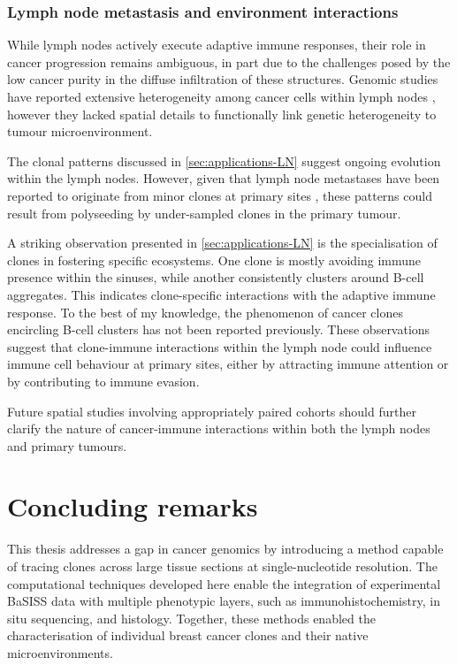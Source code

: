 \subsubsection*{Lymph node metastasis and environment interactions}

While lymph nodes actively execute adaptive immune responses, their role in cancer progression remains ambiguous, in part due to the challenges posed by the low cancer purity in the diffuse infiltration of these structures. Genomic studies have reported extensive heterogeneity among cancer cells within lymph nodes \parencite{Pal2021-rf,Barry2018-el,Bao2018-kj}, however they lacked spatial details to functionally link genetic heterogeneity to tumour microenvironment.

The clonal patterns discussed in \cref{sec:applications-LN} suggest ongoing evolution within the lymph nodes. However, given that lymph node metastases have been reported to originate from minor clones at primary sites \parencite{Bao2018-kj}, these patterns could result from polyseeding by under-sampled clones in the primary tumour.

A striking observation presented in \cref{sec:applications-LN} is the specialisation of clones in fostering specific ecosystems. One clone is mostly avoiding immune presence within the sinuses, while another consistently clusters around B-cell aggregates. This indicates clone-specific interactions with the adaptive immune response. To the best of my knowledge, the phenomenon of cancer clones encircling B-cell clusters has not been reported previously. These observations suggest that clone-immune interactions within the lymph node could influence immune cell behaviour at primary sites, either by attracting immune attention or by contributing to immune evasion.

Future spatial studies involving appropriately paired cohorts should further clarify the nature of cancer-immune interactions within both the lymph nodes and primary tumours.

\section{Concluding remarks}
\label{sec:discussion-colcluding-remarks}
This thesis addresses a gap in cancer genomics by introducing a method capable of tracing clones across large tissue sections at single-nucleotide resolution. The computational techniques developed here enable the integration of experimental \ac{BaSISS} data with multiple phenotypic layers, such as immunohistochemistry, in situ sequencing, and histology. Together, these methods enabled the characterisation of individual breast cancer clones and their native microenvironments. 

